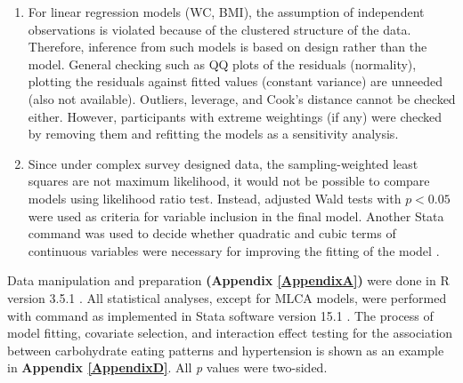\begin{enumerate}
	\item For linear regression models (WC, BMI), the assumption of independent observations is violated because of the clustered structure of the data. Therefore, inference from such models is based on design rather than the model.  
	General checking such as QQ plots of the residuals (normality), plotting the residuals against fitted values (constant variance) are unneeded (also not available). Outliers, leverage, and Cook's distance cannot be checked either. However, participants with extreme weightings (if any) were checked by removing them and refitting the models as a sensitivity analysis.
	\item Since under complex survey designed data, the sampling-weighted least squares are not maximum likelihood, it would not be possible to compare models using likelihood ratio test. Instead, adjusted Wald tests with $p < 0.05$ were used as criteria for variable inclusion in the final model. Another Stata command  was used to decide whether quadratic and cubic terms of continuous variables were necessary for improving the fitting of the model \parencite{pregibon1980goodness}. 
\end{enumerate}

Data manipulation and preparation \textbf{(Appendix \ref{AppendixA})} were done in R version 3.5.1 \parencite{R3.5.1}. All statistical analyses, except for MLCA models, were performed with  command as implemented in Stata software version 15.1 \parencite{stata15}. The process of model fitting, covariate selection, and interaction effect testing for the association between carbohydrate eating patterns and hypertension is shown as an example in \textbf{Appendix \ref{AppendixD}}. All \textit{p} values were two-sided.
